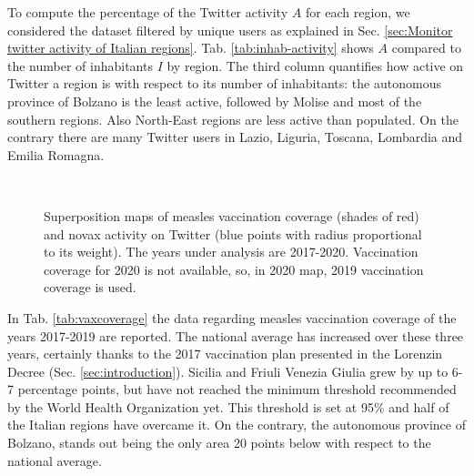 \documentclass[prb,twocolumn,9pt]{revtex4-1}
\begin{document}
To compute the percentage of the Twitter activity $A$ for each region, we considered the dataset filtered by unique users as explained in Sec. \ref{sec:Monitor twitter activity of Italian regions}.
Tab. \ref{tab:inhab-activity} shows $A$ compared to the number of inhabitants $I$ by region. The third column quantifies how active on Twitter a region is with respect to its number of inhabitants: the autonomous province of Bolzano is the least active, followed by Molise and most of the southern regions. Also North-East regions are less active than populated. On the contrary there are many Twitter users in Lazio, Liguria, Toscana, Lombardia and Emilia Romagna.


	\begin{figure*}[t]
	\begin{minipage}[c]{0.49\linewidth}
	\centering
	\end{minipage}
	\begin{minipage}[]{0.49\linewidth}
	\centering
	\end{minipage} \\
	\vfill
	\begin{minipage}[c]{0.49\linewidth}
	\centering
	\end{minipage}
	\begin{minipage}[]{0.49\linewidth}
	\centering
	\end{minipage}
	\caption{\label{fig:map_result} Superposition maps of measles vaccination coverage (shades of red) and novax activity on Twitter (blue points with radius proportional to its weight). The years under analysis are 2017-2020. Vaccination coverage for 2020 is not available, so, in 2020 map, 2019 vaccination coverage is used.}
	\end{figure*}
    
In Tab. \ref{tab:vaxcoverage} the data regarding measles vaccination coverage of the years 2017-2019 \cite{ministerosalute} are reported. The national average has increased over these three years, certainly thanks to the 2017 vaccination plan presented in the Lorenzin Decree (Sec. \ref{sec:introduction}). Sicilia and Friuli Venezia Giulia grew by up to 6-7 percentage points, but have not  reached the minimum threshold recommended by the World Health Organization yet. This threshold is set at 95$\%$ \cite{ministerosalute} and half of the Italian regions have overcame it. On the contrary, the autonomous province of Bolzano, stands out being the only area 20 points below with respect to the national average.
\end{document}
